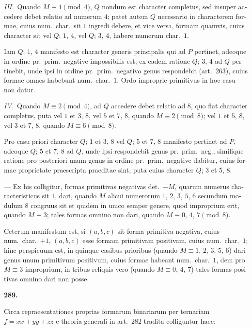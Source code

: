 \documentclass[12pt,a4paper]{article}
\theoremstyle{plain}
\theoremstyle{definition}
\theoremstyle{remark}
\begin{document}
\begin{otherlanguage}{latin}
\textit{III.}\ Quando $M \equiv 1 \pmod{4}$, $Q$ nondum est character completus, sed insuper accedere debet relatio ad numerum $4$; patet autem $Q$ necessario in characterem formae, cuius num.\ char.\ sit $1$ ingredi debere, et vice versa, formam quamvis, cuius character sit vel $Q$; $1$, $4$, vel $Q$; $3$, $4$, habere numerum char.\ $1$.

Iam $Q$; $1$, $4$ manifesto est character generis principalis qui ad $P$ pertinet, adeoque in ordine pr.\ prim.\ negative impossibilis est; ex eadem ratione $Q$; $3$, $4$ ad $Q$ pertinebit, unde ipsi in ordine pr.\ prim.\ negativo genus respondebit (art.\ 263), cuius formae omnes habebunt num.\ char.\ $1$. Ordo improprie primitivus in hoc casu non datur.

\textit{IV.}\ Quando $M \equiv 2 \pmod{4}$, ad $Q$ accedere debet relatio ad $8$, quo fiat character completus, puta vel $1$ et $3$, $8$, vel $5$ et $7$, $8$, quando $M \equiv 2 \pmod{8}$; vel $1$ et $5$, $8$, vel $3$ et $7$, $8$, quando $M \equiv 6 \pmod{8}$.

Pro casu priori character $Q$; $1$ et $3$, $8$ vel $Q$; $5$ et $7$, $8$ manifesto pertinet ad $P$, adeoque $Q$; $5$ et $7$, $8$ ad $Q$, unde ipsi respondebit genus pr.\ prim.\ neg.; similique ratione pro posteriori unum genus in ordine pr.\ prim.\ negative dabitur, cuius formae proprietate praescripta praeditae sint, puta cuius character $Q$; $3$ et $5$, $8$.

--- Ex his colligitur, formas primitivas negativas det.\ $-M$, quarum numerus characteristicus sit $1$, dari, quando $M$ alicui numerorum $1$, $2$, $3$, $5$, $6$ secundum modulum $8$ congruus sit et quidem in unico semper genere, quod improprium erit, quando $M \equiv 3$; tales formas omnino non dari, quando $M \equiv 0$, $4$, $7 \pmod{8}$.

Ceterum manifestum est, si $(a, b, c)$ sit forma primitiva negativa, cuius num.\ char.\ $+1$, $(a, b, c)$ esse formam primitivam positivam, cuius num.\ char.\ $1$; hinc perspicuum est, in quinque casibus prioribus (quando $M \equiv 1$, $2$, $3$, $5$, $6$) dari genus unum primitivum positivum, cuius formae habeant num.\ char.\ $1$, dem pro $M \equiv 3$ improprium, in tribus reliquis vero (quando $M \equiv 0$, $4$, $7$) tales formas positivas omnino dari non posse.

\bigskip

\textbf{289.}

Circa repraesentationes proprias formarum binariarum per ternariam $f = xx + yy + zz$ e theoria generali in art.\ 282 tradita colliguntur haec:


\end{otherlanguage}
\end{document}
